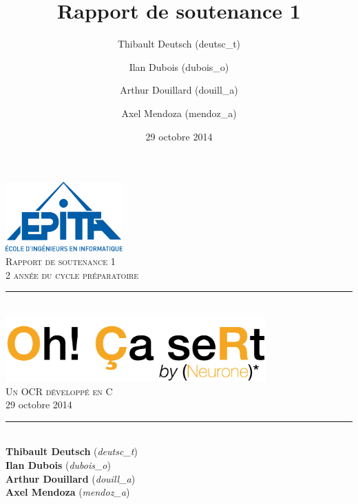 \documentclass[11pt]{report}
\title{Rapport de soutenance 1}
\author{Thibault Deutsch (deutsc\_t) \and Ilan Dubois (dubois\_o) \and Arthur Douillard (douill\_a) \and Axel Mendoza (mendoz\_a)}
\date{29 octobre 2014}
\begin{document}
\renewcommand{\labelitemi}{$\bullet$}

\begin{titlepage}
\newcommand{\HRule}{\rule{\linewidth}{0.5mm}} %

\flushright
\includegraphics[width = 4.5cm]{epita.png}\\[0.5cm] %

\textsc{\Large Rapport de soutenance 1}\\[0.15cm] %
\textsc{\large 2 année du cycle préparatoire}\\[3cm] %

\center
\HRule \\[0.5cm]
\includegraphics[width = 10cm]{logo.png}\\[1cm]
\textsc{\Large Un OCR développé en C}\\[0.1cm]
\large 29 octobre 2014\\[0.1cm]
\HRule \\[3cm]

\Large
\textbf{Thibault Deutsch} (\emph{deutsc\_t}) \\
\textbf{Ilan Dubois} (\emph{dubois\_o}) \\
\textbf{Arthur Douillard} (\emph{douill\_a}) \\
\textbf{Axel Mendoza} (\emph{mendoz\_a})\\[2cm]

\vfill %

\end{titlepage}
\end{document}
